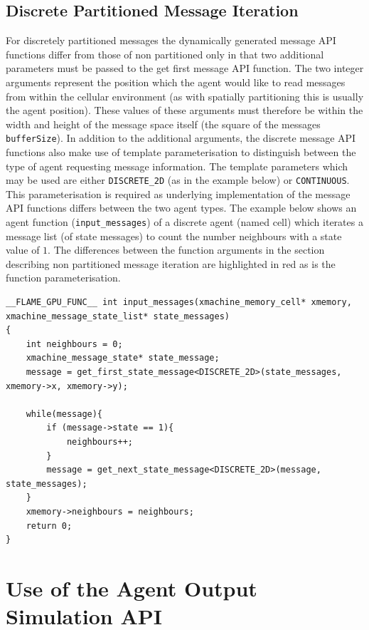 \documentclass[11pt, a4paper, onecolumn, oneside]{report}
\begin{document}
\subsection{Discrete Partitioned Message Iteration}
\label{sec:353}


For discretely partitioned messages the dynamically generated message API functions differ from those of non partitioned only in that two additional parameters must be passed to the get first message API function.
The two integer arguments represent the position which the agent would like to read messages from within the cellular environment (as with spatially partitioning this is usually the agent position).
These values of these arguments must therefore be within the width and height of the message space itself (the square of the messages \texttt{bufferSize}).
In addition to the additional arguments, the discrete message API functions also make use of template parameterisation to distinguish between the type of agent requesting message information.
The template parameters which may be used are either \texttt{DISCRETE_2D} (as in the example below) or \texttt{CONTINUOUS}.
This parameterisation is required as underlying implementation of the message API functions differs between the two agent types.
The example below shows an agent function (\texttt{input_messages}) of a discrete agent (named cell) which iterates a message list (of state messages) to count the number neighbours with a state value of $1$.
The differences between the function arguments in the section describing non partitioned message iteration are highlighted in red as is the function parameterisation.

\begin{verbatim}
__FLAME_GPU_FUNC__ int input_messages(xmachine_memory_cell* xmemory, xmachine_message_state_list* state_messages)
{
    int neighbours = 0;
    xmachine_message_state* state_message;
    message = get_first_state_message<DISCRETE_2D>(state_messages, xmemory->x, xmemory->y);
    
    while(message){
        if (message->state == 1){
            neighbours++;
        }
        message = get_next_state_message<DISCRETE_2D>(message, state_messages);
    }
    xmemory->neighbours = neighbours;
    return 0;
}
\end{verbatim}


\section{Use of the Agent Output Simulation API}
\label{sec:36}
\end{document}
